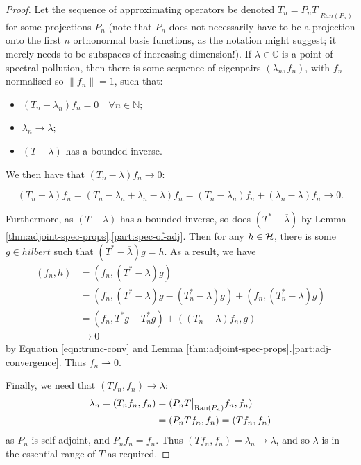 \documentclass[../main.tex]{subfiles}
\begin{document}
\begin{proof}
Let the sequence of approximating operators be denoted $T_n = P_n T\big|_{Ran(P_n)}$ for some projections $P_n$ (note that $P_n$ does not necessarily have to be a projection onto the first $n$ orthonormal basis functions, as the notation might suggest; it merely needs to be subspaces of increasing dimension!). If $\lambda \in \mathbb{C}$ is a point of spectral pollution, then there is some sequence of eigenpairs $(\lambda_n, f_n)$, with $f_n$ normalised so $\|f_n\| = 1$, such that:
\begin{itemize}
\item $(T_n - \lambda_n)f_n =0 \quad \forall n \in \mathbb{N}$;
\item $\lambda_n \rightarrow \lambda$;
\item $(T - \lambda)$ has a bounded inverse.
\end{itemize}
We then have that $(T_n - \lambda)f_n \rightarrow 0$:

\begin{equation}\label{eqn:trunc-conv}
(T_n - \lambda)f_n = (T_n - \lambda_n + \lambda_n - \lambda)f_n = (T_n - \lambda_n)f_n + (\lambda_n - \lambda)f_n \rightarrow 0.
\end{equation}

Furthermore, as $(T - \lambda)$ has a bounded inverse, so does $(T^* - \overline{\lambda})$ by Lemma \ref{thm:adjoint-spec-props}.\ref{part:spec-of-adj}. Then for any $h \in \mathcal{H}$, there is some $g \in hilbert$ such that $(T^* - \overline{\lambda})g = h$. As a result, we have
\begin{align*}
(f_n, h) & = (f_n, (T^* - \overline{\lambda})g) \\
& = (f_n, (T^* - \overline{\lambda})g - (T_n^* - \overline{\lambda})g) + (f_n, (T_n^* - \overline{\lambda})g) \\
& = (f_n, T^*g - T_n^*g) + ((T_n - \lambda)f_n, g) \\
& \rightarrow 0
\end{align*}
by Equation \ref{eqn:trunc-conv} and Lemma \ref{thm:adjoint-spec-props}.\ref{part:adj-convergence}. Thus $f_n \rightharpoonup 0$.

Finally, we need that $(T f_n, f_n) \rightarrow \lambda$:
\begin{align*}
\lambda_n = (T_n f_n, f_n) & = (P_n T\big|_{\mathrm{Ran}(P_n)} f_n, f_n)  \\
& = (P_n T f_n, f_n) = (T f_n, f_n)
\end{align*}
as $P_n$ is self-adjoint, and $P_n f_n = f_n$. Thus $(T f_n, f_n) = \lambda_n \rightarrow \lambda$, and so $\lambda$ is in the essential range of $T$ as required.
\end{proof}
\end{document}
